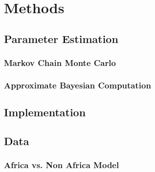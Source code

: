 \section{Methods}\label{sec:m}
\subsection{Parameter Estimation}\label{subsec:pe}
\subsubsection{Markov Chain Monte Carlo}
\subsubsection{Approximate Bayesian Computation}

\subsection{Implementation}\label{subsec:i}

\subsection{Data}\label{subsec:d}
\subsubsection{Africa vs. Non Africa Model}
